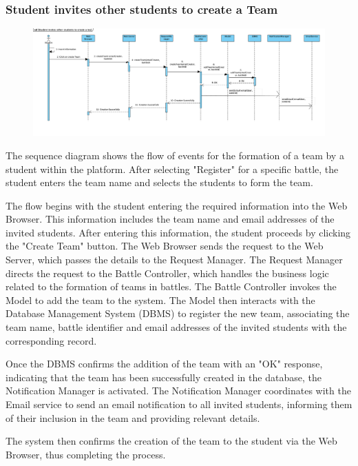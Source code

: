 \subsubsection{Student invites other students to create a Team}
\begin{figure}[H]
    \centering
    \includegraphics[width=1\textwidth]{SequenceDiagram/StudentsInviteOtherStudents.png}
    \label{fig:enter-label}
\end{figure}
The sequence diagram shows the flow of events for the formation of a team by a student within the platform. After selecting "Register" for a specific battle, the student enters the team name and selects the students to form the team.

The flow begins with the student entering the required information into the Web Browser. This information includes the team name and email addresses of the invited students. After entering this information, the student proceeds by clicking the "Create Team" button. The Web Browser sends the request to the Web Server, which passes the details to the Request Manager.  The Request Manager directs the request to the Battle Controller, which handles the business logic related to the formation of teams in battles. The Battle Controller invokes the Model to add the team to the system. The Model then interacts with the Database Management System (DBMS) to register the new team, associating the team name, battle identifier and email addresses of the invited students with the corresponding record.

Once the DBMS confirms the addition of the team with an "OK" response, indicating that the team has been successfully created in the database, the Notification Manager is activated. The Notification Manager coordinates with the Email service to send an email notification to all invited students, informing them of their inclusion in the team and providing relevant details.

The system then confirms the creation of the team to the student via the Web Browser, thus completing the process.

